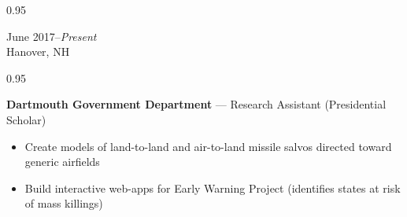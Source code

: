 \documentclass[a4paper,9pt]{article}
\newcommand{\mainMarginBottom}{\vspace*{2.5pt}}
\newcommand{\newLine}{\\}
\newcommand{\doubleColumnGap}{\hspace{4mm}}
\newcommand{\withinSectionMarginBetween}{\vspace{-2.75ex}}
\newcommand{\mainLineSpacing}{0.95}
\begin{document}
\begin{minipage}[t]{0.20\linewidth}
  \begin{small}
    \begin{spacing}\mainLineSpacing{}
      \begin{flushright}
        June 2017--\textit{Present}
        \newLine{}
        \mainMarginBottom{}
        Hanover, NH
      \end{flushright}
    \end{spacing}
  \end{small}
\end{minipage}
\doubleColumnGap{}
\begin{minipage}[t]{0.75\linewidth}
  \begin{small}
    \begin{spacing}\mainLineSpacing{}
      \begin{flushleft}
        \textbf{Dartmouth Government Department} --- Research Assistant (Presidential Scholar)
        \mainMarginBottom{}
        \begin{itemize}[itemsep=1pt,topsep=0pt,leftmargin=*]
          \item Create models of land-to-land and air-to-land missile salvos directed toward generic airfields
          \item Build interactive web-apps for Early Warning Project (identifies states at risk of mass killings)
        \end{itemize}
      \end{flushleft}
    \end{spacing}
  \end{small}
\end{minipage}

\withinSectionMarginBetween{}
\end{document}
